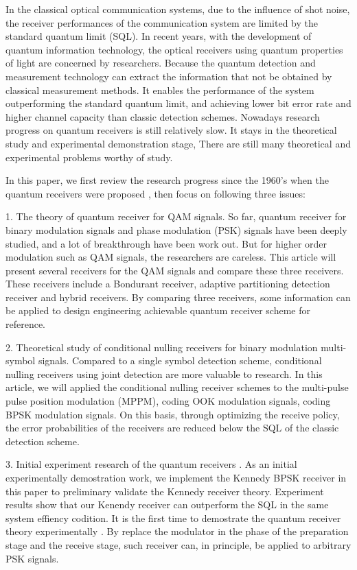 \begin{enabstract}
In the classical optical communication systems, 
due to the influence of shot noise,
the receiver performances of the communication system  
are limited by the standard quantum limit (SQL).
In recent years, with the development of quantum information technology, 
the optical receivers using quantum properties of light 
are concerned by researchers.
Because the quantum detection and measurement  technology can extract the information 
that not be obtained by classical measurement methods.
It enables the performance of the system outperforming the standard quantum limit,
and achieving lower bit error rate and higher channel capacity than classic detection schemes.
Nowadays research progress on quantum receivers is still relatively slow. 
It stays in the theoretical study and experimental demonstration stage,
There are still many theoretical and experimental problems worthy of study.


In this paper, we first review the research progress since the 1960's when the quantum receivers were proposed ,
then focus on following three issues:


1. The theory of quantum receiver for QAM signals.
So far, quantum receiver for binary modulation signals and phase modulation (PSK) signals 
have been deeply studied, and a lot of breakthrough have been work out.
But for higher order modulation such as QAM signals, the researchers are careless.
This article will present several receivers for the QAM signals and compare these three receivers.
These receivers include a  Bondurant receiver, 
adaptive partitioning detection receiver and hybrid receivers.
By comparing three receivers, some information can be applied to 
design engineering achievable quantum receiver scheme for reference.

2. Theoretical study of conditional nulling receivers for binary modulation multi-symbol signals.
Compared to a single symbol detection scheme, conditional nulling receivers using joint detection  
are more valuable to research. In this article, we will applied the conditional nulling receiver schemes
to the multi-pulse pulse position modulation (MPPM), coding OOK modulation signals,
coding BPSK modulation signals. On this basis, through optimizing the receive policy,
the error probabilities of the receivers are reduced below the SQL of the classic detection scheme.

3. Initial experiment research of  the quantum receivers .
As an initial  experimentally  demostration work, we implement the Kennedy BPSK receiver in this paper 
to preliminary validate the Kennedy receiver theory.
Experiment results show that our Kenendy receiver can outperform the SQL in the same system effiency codition.
It is the first time to demostrate the quantum receiver theory  experimentally .
By replace the modulator in the phase of the preparation stage and the receive stage,
such receiver can, in principle, be applied to arbitrary PSK signals.

\end{enabstract}
